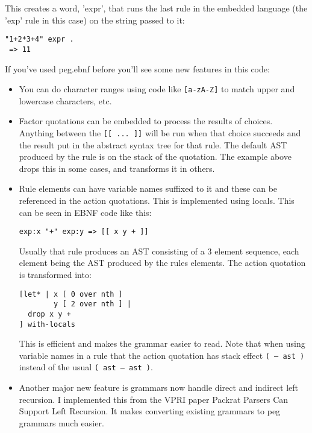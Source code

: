 This creates a word, 'expr', that runs the last rule in the embedded
language (the 'exp' rule in this case) on the string passed to it:

\begin{verbatim}
"1+2*3+4" expr .
 => 11
\end{verbatim}

If you've used peg.ebnf before you'll see some new features in this code:

\begin{itemize}
\item You can do character ranges using code like \texttt{[a-zA-Z]} to
  match upper and lowercase characters, etc.

\item Factor quotations can be embedded to process the results of
  choices. Anything between the \texttt{[[ ... ]]} will be run when that choice
  succeeds and the result put in the abstract syntax tree for that
  rule. The default AST produced by the rule is on the stack of the
  quotation. The example above drops this in some cases, and
  transforms it in others.

\item Rule elements can have variable names suffixed to it and these
  can be referenced in the action quotations. This is implemented
  using locals. This can be seen in EBNF code like this:
\begin{verbatim}
exp:x "+" exp:y => [[ x y + ]]
\end{verbatim}

      Usually that rule produces an AST consisting of a 3 element
      sequence, each element being the AST produced by the rules
      elements. The action quotation is transformed into:

\begin{verbatim}
[let* | x [ 0 over nth ] 
        y [ 2 over nth ] |
  drop x y + 
] with-locals
\end{verbatim}

      This is efficient and makes the grammar easier to read. Note
      that when using variable names in a rule that the action
      quotation has stack effect \texttt{( -- ast )} instead of
      the usual \texttt{( ast -- ast )}.

\item Another major new feature is grammars now handle direct and
  indirect left recursion. I implemented this from the VPRI paper
  Packrat Parsers Can Support Left Recursion. It makes converting
  existing grammars to peg grammars much easier.


\end{itemize}
